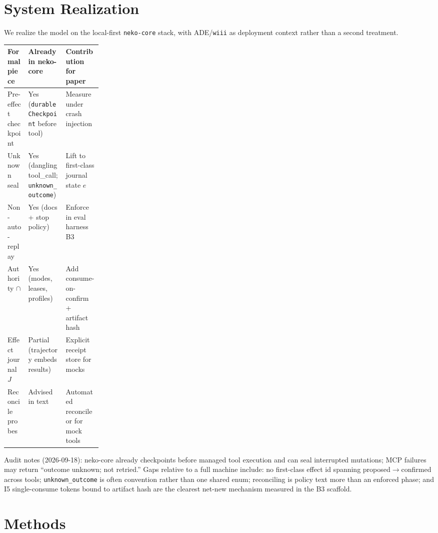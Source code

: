\documentclass[11pt,a4paper]{article}
\begin{document}
\section{System Realization}
\label{sec:system}

We realize the model on the local-first \texttt{neko-core} stack, with
ADE/\texttt{wiii} as deployment context rather than a second treatment.

\begin{center}
\footnotesize
\begin{tabularx}{\linewidth}{@{}>{\raggedright\arraybackslash}p{0.22\linewidth}>{\raggedright\arraybackslash}X>{\raggedright\arraybackslash}X@{}}
\toprule
Formal piece & Already in neko-core & Contribution for paper \\
\midrule
Pre-effect checkpoint &
  Yes (\texttt{durableCheckpoint} before tool) &
  Measure under crash injection \\
Unknown seal &
  Yes (dangling tool\_call; \texttt{unknown\_outcome}) &
  Lift to first-class journal state $e$ \\
Non-auto-replay &
  Yes (docs + stop policy) &
  Enforce in eval harness B3 \\
Authority $\cap$ &
  Yes (modes, leases, profiles) &
  Add consume-on-confirm + artifact hash \\
Effect journal $J$ &
  Partial (trajectory embeds results) &
  Explicit receipt store for mocks \\
Reconcile probes &
  Advised in text &
  Automated reconcileor for mock tools \\
\bottomrule
\end{tabularx}
\end{center}

\noindent Audit notes (2026-09-18): neko-core already checkpoints before
managed tool execution and can seal interrupted mutations; MCP failures may
return ``outcome unknown; not retried.'' Gaps relative to a full machine
include: no first-class effect id spanning proposed$\to$confirmed across
tools; \texttt{unknown\_outcome} is often convention rather than one shared
enum; reconciling is policy text more than an enforced phase; and I5
single-consume tokens bound to artifact hash are the clearest net-new
mechanism measured in the B3 scaffold.

\section{Methods}
\label{sec:methods}
\end{document}
